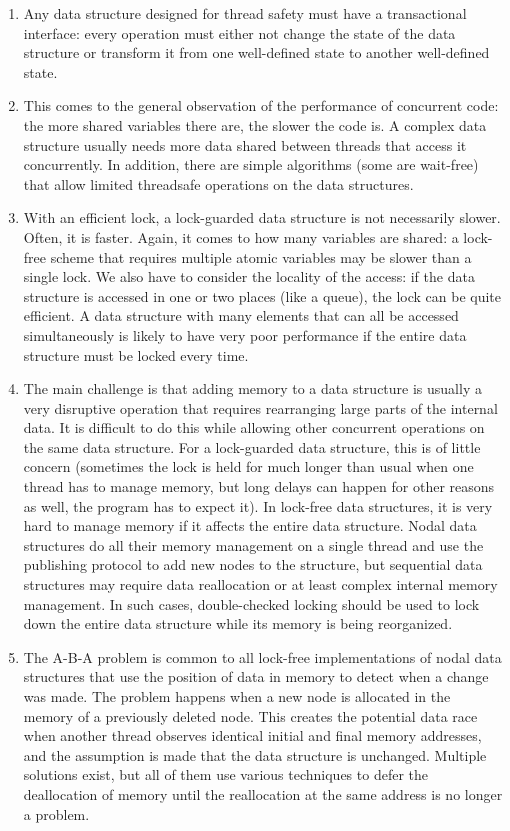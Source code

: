 \begin{enumerate}
\item 
Any data structure designed for thread safety must have a transactional interface:
every operation must either not change the state of the data structure or transform it from one well-defined state to another well-defined state.

\item 
This comes to the general observation of the performance of concurrent code: the more shared variables there are, the slower the code is. A complex data structure usually needs more data shared between threads that access it concurrently. In addition, there are simple algorithms (some are wait-free) that allow limited threadsafe operations on the data structures.

\item 
With an efficient lock, a lock-guarded data structure is not necessarily slower. Often, it is faster. Again, it comes to how many variables are shared: a lock-free scheme that requires multiple atomic variables may be slower than a single lock. We also have to consider the locality of the access: if the data structure is accessed in one or two places (like a queue), the lock can be quite efficient. A data structure with many elements that can all be accessed simultaneously is likely to have very poor performance if the entire data structure must be locked every time.

\item
The main challenge is that adding memory to a data structure is usually a very disruptive operation that requires rearranging large parts of the internal data. It is difficult to do this while allowing other concurrent operations on the same data structure. For a lock-guarded data structure, this is of little concern (sometimes the lock is held for much longer than usual when one thread has to manage memory, but long delays can happen for other reasons as well, the program has to expect it). In lock-free data structures, it is very hard to manage memory if it affects the entire data structure. Nodal data structures do all their memory management on a single thread and use the publishing protocol to add new nodes to the structure, but sequential data structures may require data reallocation or at least complex internal memory management. In such cases, double-checked locking should be used to lock down the entire data structure while its memory is being reorganized.

\item
The A-B-A problem is common to all lock-free implementations of nodal data structures that use the position of data in memory to detect when a change was made. The problem happens when a new node is allocated in the memory of a previously deleted node. This creates the potential data race when another thread observes identical initial and final memory addresses, and the assumption is made that the data structure is unchanged. Multiple solutions exist, but all of them use various techniques to defer the deallocation of memory until the reallocation at the same address is no longer a problem.

\end{enumerate}